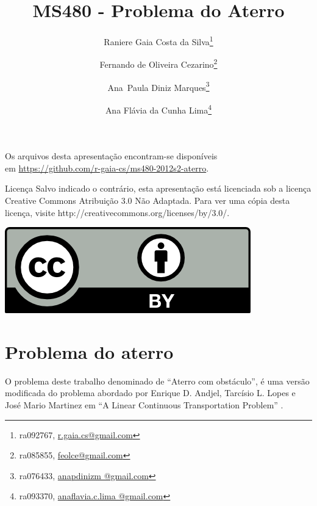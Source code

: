 \documentclass[11pt]{beamer}
\begin{document}
\title{MS480 - Problema do Aterro}
\author[Silva, Cezarino, Marques e Lima]{Raniere Gaia Costa da Silva\footnote{ra092767,
\url{r.gaia.cs@gmail.com}} \and Fernando de Oliveira Cezarino\footnote{ra085855,
\url{feolce@gmail.com}} \and Ana~Paula Diniz Marques\footnote{ra076433,
\url{anapdinizm @gmail.com}} \and Ana Flávia da Cunha Lima\footnote{ra093370,
\url{anaflavia.c.lima @gmail.com}}}

\begin{frame}
    \maketitle
\end{frame}

\begin{frame}
    \begin{block}{}
        Os arquivos desta apresentação encontram-se disponíveis \\
        em \url{https://github.com/r-gaia-cs/ms480-2012s2-aterro}.
    \end{block}

    \begin{block}{Licença}
        Salvo indicado o contrário, esta apresentação está licenciada sob a licença
        Creative Commons Atribuição 3.0 Não Adaptada. Para ver uma cópia desta
        licença, visite http://creativecommons.org/licenses/by/3.0/.
        \begin{center}
            \includegraphics{../figuras/cc-by.png}
        \end{center}
    \end{block}
\end{frame}

\begin{frame}
    \tableofcontents
\end{frame}

\section{Problema do aterro}
\begin{frame}
O problema deste trabalho denominado de ``Aterro com obstáculo'', é uma
versão modificada do problema abordado por Enrique D. Andjel, Tarcísio L. Lopes
e José Mario Martinez em ``A Linear Continuous Transportation Problem''
\cite{Andjel:1989:TP}.
\end{frame}
\end{document}
